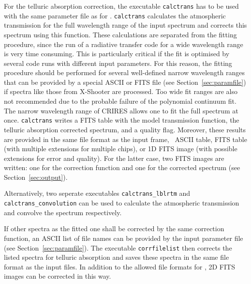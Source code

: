 For the telluric absorption correction, the executable {\tt calctrans} has to
be used with the same parameter file as for \mf. {\tt calctrans}
calculates the atmospheric transmission for the full wavelength range of the
input spectrum and corrects this spectrum using this function. These
calculations are separated from the fitting procedure, since the run of a
radiative transfer code for a wide wavelength range is very time consuming.
This is particularly critical if the fit is optimised by several code runs with
different input parameters. For this reason, the fitting procedure should be
performed for several well-defined narrow wavelength ranges that can be
provided by a special ASCII or FITS file (see Section~\ref{sec:paramfile}) if
spectra like those from X-Shooter are processed. Too wide fit ranges are also
not recommended due to the probable failure of the polynomial continuum fit.
The narrow wavelength range of CRIRES allows one to fit the full spectrum at
once. {\tt calctrans} writes a FITS table with the model transmission function,
the telluric absorption corrected spectrum, and a quality flag. Moreover, these
results are provided in the same file format as the input frame, \ie\ ASCII
table, FITS table (with multiple extensions for multiple chips), or 1D FITS
image (with possible extensions for error and quality). For the latter case,
two FITS images are written: one for the correction function and one for the
corrected spectrum (see Section~\ref{sec:output}).

Alternatively, two seperate executables {\tt calctrans\_lblrtm} and 
{\tt calctrans\_convolution} can be used to calculate the atmospheric
transmission and convolve the spectrum respectively.

If other spectra as the fitted one shall be corrected by the same correction
function, an ASCII list of file names can be provided by the input parameter
file (see Section~\ref{sec:paramfile}). The executable {\tt corrfilelist} then
corrects the listed spectra for telluric absorption and saves these spectra in
the same file format as the input files. In addition to the allowed file
formats for \mf, 2D FITS images can be corrected in this way.
